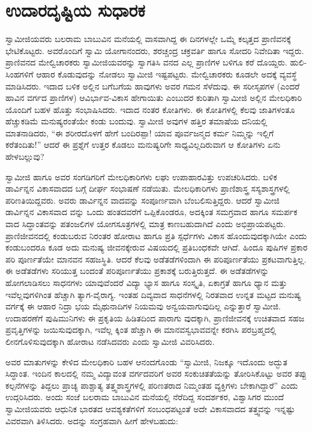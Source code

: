 
\chapter{ಉದಾರದೃಷ್ಟಿಯ ಸುಧಾರಕ}

\noindent

ಸ್ವಾಮೀಜಿಯವರು ಬಲರಾಮ ಬಾಬುವಿನ ಮನೆಯಲ್ಲಿ ವಾಸವಾಗಿದ್ದ ಈ ದಿನಗಳಲ್ಲೇ ಒಮ್ಮೆ ಕಲ್ಕತ್ತದ ಪ್ರಾಣಿವನಕ್ಕೆ  ಭೇಟಿಕೊಟ್ಟರು. ಅವರೊಂದಿಗೆ ಸ್ವಾಮಿ ಯೋಗಾನಂದರು, ಶರಚ್ಚಂದ್ರ ಚಕ್ರವರ್ತಿ ಹಾಗೂ ಸೋದರಿ ನಿವೇದಿತಾ ಇದ್ದರು. ಪ್ರಾಣಿವನದ ಮೇಲ್ವಿಚಾರಕರು ಸ್ವಾಮೀಜಿಯವರನ್ನು ಸ್ವಾಗತಿಸಿ ವನದ ಎಲ್ಲ ಪ್ರಾಣಿಗಳ ಬಳಿಗೂ ಕರೆ ದೊಯ್ದರು. ಹುಲಿ-ಸಿಂಹಗಳಿಗೆ ಆಹಾರ ಕೊಡುವುದನ್ನು ನೋಡಲು ಸ್ವಾಮೀಜಿ ಇಷ್ಟಪಟ್ಟರು. ಮೇಲ್ವಿಚಾರಕರು ಕೂಡಲೇ ಅದಕ್ಕೆ ವ್ಯವಸ್ಥೆ ಮಾಡಿಸಿದರು. ಇದಾದ ಬಳಿಕ ಅಲ್ಲಿನ ಬಗೆಬಗೆಯ ಹಾವುಗಳು ಅವರ ಗಮನ ಸೆಳೆದುವು. ಈ ಸರೀಸೃಪಗಳ (ಎಂದರೆ ಹಾವಿನ ವರ್ಗದ ಪ್ರಾಣಿಗಳ) ಆವಿರ್ಭಾವ-ವಿಕಾಸ ಹೇಗಾಯಿತು ಎಂಬುದರ ಕುರಿತಾಗಿ ಸ್ವಾಮೀಜಿ ಅಲ್ಲಿನ ಮೇಲಧಿಕಾರಿ ಯೊಂದಿಗೆ ಬಹಳ ಹೊತ್ತು ಸಂಭಾಷಿಸಿದರು. ಇದಾದ ನಂತರ ಕೋತಿಗಳು. ಈ ಕೋತಿಗಳಲ್ಲಿ ಕೆಲವು ಜಾತಿಗಳಂತೂ ಹೆಚ್ಚುಕಡಿಮೆ ಮನುಷ್ಯರಂತೆಯೇ ಕಂಡು ಬಂದುವು. ಸ್ವಾಮೀಜಿ ಅವುಗಳ ಹತ್ತಿರ ತಮಾಷೆಯ ದನಿಯಲ್ಲಿ ಮಾತನಾಡಿದರು, “ಈ ಶರೀರದೊಳಗೆ ಹೇಗೆ ಬಂದಿರಪ್ಪಾ! ಯಾವ ಪೂರ್ವಜನ್ಮದ ಕರ್ಮ ನಿಮ್ಮನ್ನು ಇಲ್ಲಿಗೆ ಕರೆತಂದಿತು!” ಆದರೆ ಈ ಪ್ರಶ್ನೆಗೆ ಉತ್ತರ ಕೊಡಲು ಮನುಷ್ಯರಿಗೇ ಸಾಧ್ಯವಿಲ್ಲದಿರುವಾಗ ಆ ಕೋತಿಗಳು ಏನು ಹೇಳಬಲ್ಲುವು?

ಸ್ವಾಮೀಜಿ ಹಾಗೂ ಅವರ ಸಂಗಡಿಗರಿಗೆ ಮೇಲಧಿಕಾರಿಗಳು ಲಘು ಉಪಾಹಾರವಿತ್ತು ಉಪಚರಿಸಿದರು. ಬಳಿಕ ಡಾರ್ವಿನ್ನನ ವಿಕಾಸವಾದದ ಬಗ್ಗೆ ದೀರ್ಘ ಸಂಭಾಷಣೆ ನಡೆಯಿತು. ಮೇಲಧಿಕಾರಿಗಳು ಪ್ರಾಣಿಶಾಸ್ತ್ರ ಸಸ್ಯಶಾಸ್ತ್ರಗಳಲ್ಲಿ ಪರಿಣತಿಯಿದ್ದವರು. ಅವರು ಡಾರ್ವಿನ್ನನ ವಾದವನ್ನು ಸಂಪೂರ್ಣವಾಗಿ ಬೆಂಬಲಿಸುತ್ತಿದ್ದರು. ಆದರೆ ಸ್ವಾಮೀಜಿ ಡಾರ್ವಿನ್ನನ ವಿಕಾಸವಾದ ವನ್ನು ಒಂದು ಹಂತದವರೆಗೆ ಒಪ್ಪಿಕೊಂಡರೂ, ಅದಕ್ಕಿಂತ ಸಮಗ್ರವಾದ ಹಾಗೂ ಸಮರ್ಪಕ ವಾದ ಸಿದ್ಧಾಂತವನ್ನು ಪತಂಜಲಿಗಳ ಯೋಗಸೂತ್ರಗಳಲ್ಲಿ ಮಾತ್ರ ಕಾಣಬಹುದಾಗಿದೆ ಎಂದು ಅಭಿಪ್ರಾಯಪಟ್ಟರು. ಪ್ರಾಣಿಜೀವನದಲ್ಲಿ ಕಂಡುಬರುವ ನಿರಂತರ ಹೋರಾಟ ಹಾಗೂ ಪ್ರತಿ ಸ್ಪರ್ಧೆಗಳು ವಿಕಾಸ ಹೊಂದುವುದಕ್ಕಾಗಿಯೇ ಎಂದು ಕಂಡುಬಂದರೂ ಕೂಡ ಅದು ಮನುಷ್ಯ ಜೀವನಕ್ಕೇರುವ ವಿಷಯದಲ್ಲಿ ಪ್ರತಿಬಂಧಕವೇ ಆಗಿದೆ. ಹಿಂದೂ ಪುಷಿಗಳ ಪ್ರಕಾರ ಪರಿ ಪೂರ್ಣತೆಯೇ ಮಾನವನ ಸಹಜಸ್ಥಿತಿ. ಆದರೆ ಕೆಲವು ಅಡೆತಡೆಗಳಿಂದಾಗಿ ಈ ಪರಿಪೂರ್ಣತೆಯು ಪ್ರಕಟವಾಗುತ್ತಿಲ್ಲ. ಈ ಅಡೆತಡೆಗಳು ಸರಿಯುತ್ತ ಬಂದಂತೆ ಪರಿಪೂರ್ಣತೆಯು ಪ್ರಕಾಶಕ್ಕೆ ಬರುತ್ತಿರುತ್ತದೆ. ಈ ಅಡೆತಡೆಗಳನ್ನು ಹೋಗಲಾಡಿಸಲು ಸಾಧನಗಳು ಯಾವುವೆಂದರೆ ವಿದ್ಯಾ ಭ್ಯಾಸ ಹಾಗೂ ಸಂಸ್ಕೃತಿ, ಏಕಾಗ್ರತೆ ಹಾಗೂ ಧ್ಯಾನ ಮತ್ತು ಇವೆಲ್ಲವುಗಳಿಗಿಂತ ಹೆಚ್ಚಾಗಿ ತ್ಯಾಗ-ವೈರಾಗ್ಯ. ಇಂತಹ ದಿವ್ಯವಾದ ಸಾಧನೆಗಳಲ್ಲಿ ನಿರತವಾದ ಉನ್ನತ ಮಟ್ಟದ ಮನುಷ್ಯ ವರ್ಗಕ್ಕೆ ಈ ಆಹಾರ ನಿದ್ರಾ ಭಯ ಮೈಥುನಾದಿಗಳ ನಿಯಮವು ಅನ್ವಯವಾಗುವುದಿಲ್ಲ ಎನ್ನುತ್ತಾರೆ ಸ್ವಾಮೀಜಿ. ಉದಾಹರಣೆಗೆ ಪುಷಿಮುನಿಗಳು ಈ ಪ್ರಕೃತಿಯ ಹಿಡಿತದಿಂದ ಪಾರಾಗು ವುದಕ್ಕಾಗಿ, ಪ್ರಾಣಿಜೀವನಕ್ಕೆ ಉಚಿತವಾದ ಸಹಜ ಪ್ರವೃತ್ತಿಗಳನ್ನು ಜಯಿಸುವುದಕ್ಕಾಗಿ, ಇವೆಲ್ಲ ಕ್ಕಿಂತ ಹೆಚ್ಚಾಗಿ ಈ ಮಾನವಸ್ವಭಾವವನ್ನೇ ಕರಗಿಸಿ ಪರಬ್ರಹ್ಮದಲ್ಲಿ ಲೀನಗೊಳಿಸುವುದಕ್ಕಾಗಿ ಹೋರಾಟ ನಡೆಸಿದವರು ಎಂದು ಸ್ವಾಮೀಜಿ ವಿವರಿಸಿದರು.

ಅವರ ಮಾತುಗಳನ್ನು ಕೇಳಿದ ಮೇಲಧಿಕಾರಿ ಬಹಳ ಆನಂದಗೊಂಡು “ಸ್ವಾಮೀಜಿ, ನಿಜಕ್ಕೂ ಇದೊಂದು ಅದ್ಭುತ ಸಿದ್ಧಾಂತ. ಇಂದಿನ ಕಾಲದಲ್ಲಿ ನಮ್ಮ ವಿದ್ಯಾವಂತ ವರ್ಗದವರಿಗೆ ಅವರ ಸಂಕುಚಿತತೆಯನ್ನು ತೋರಿಸಿಕೊಟ್ಟು ಅವರ ತಪ್ಪು ಕಲ್ಪನೆಗಳನ್ನು ತಿದ್ದಲು ಪ್ರಾಚ್ಯ ಪಾಶ್ಚಾತ್ಯ ತತ್ತ್ವಶಾಸ್ತ್ರಗಳಲ್ಲಿ ಪರಿಣತರಾದ ನಿಮ್ಮಂತಹ ವ್ಯಕ್ತಿಗಳು ಬೇಕಾಗಿದ್ದಾರೆ” ಎಂದು ಉದ್ಗರಿಸಿದರು. ಅಂದು ಸಂಜೆ ಬಲರಾಮ ಬಾಬುವಿನ ಮನೆಯಲ್ಲಿ ನೆರೆದಿದ್ದ ಸಂದರ್ಶಕರ, ವಿಶ್ವಾಸಿಗರ ಮುಂದೆ ಸ್ವಾಮೀಜಿಯವರು ಆಧುನಿಕ ಭಾರತದ ಆವಶ್ಯಕತೆಗಳಿಗೆ ಸಂಬಂಧಪಟ್ಟಂತೆ ಅದೇ ವಿಕಾಸವಾದದ ತತ್ತ್ವವನ್ನು ಇನ್ನಷ್ಟು ವಿವರವಾಗಿ ತಿಳಿಸಿದರು. ಅದನ್ನು ಸಂಗ್ರಹವಾಗಿ ಹೀಗೆ ಹೇಳಬಹುದು:

